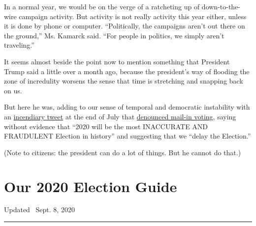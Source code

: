 In a normal year, we would be on the verge of a ratcheting up of
down-to-the-wire campaign activity. But activity is not really activity
this year either, unless it is done by phone or computer. ``Politically,
the campaigns aren't out there on the ground,'' Ms. Kamarck said. ``For
people in politics, we simply aren't traveling.''

It seems almost beside the point now to mention something that President
Trump said a little over a month ago, because the president's way of
flooding the zone of incredulity worsens the sense that time is
stretching and snapping back on us.

But here he was, adding to our sense of temporal and democratic
instability with an
\href{https://twitter.com/realDonaldTrump/status/1288818160389558273?ref_src=twsrc\%5Etfw\%7Ctwcamp\%5Etweetembed\%7Ctwterm\%5E1288818160389558273\%7Ctwgr\%5Eshare_3\&ref_url=https\%3A\%2F\%2Fwww.npr.org\%2F2020\%2F07\%2F31\%2F897724197\%2Fciting-election-delay-tweet-influential-trump-ally-now-demands-his-re-impeachmen}{incendiary
tweet} at the end of July that
\href{https://www.nytimes3xbfgragh.onion/2020/07/31/us/politics/trump-tweet-democracy.html}{denounced
mail-in voting}, saying without evidence that ``2020 will be the most
INACCURATE AND FRAUDULENT Election in history'' and suggesting that we
``delay the Election.''

(Note to citizens: the president can do a lot of things. But he cannot
do that.)

\hypertarget{our-2020-election-guide}{%
\section{Our 2020 Election Guide}\label{our-2020-election-guide}}

Updated ~Sept. 8, 2020

\begin{center}\rule{0.5\linewidth}{\linethickness}\end{center}

